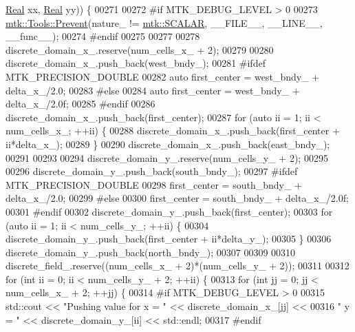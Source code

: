 \begin{DoxyCode}
      \hyperlink{group__c01-roots_gac080bbbf5cbb5502c9f00405f894857d}{Real} xx, \hyperlink{group__c01-roots_gac080bbbf5cbb5502c9f00405f894857d}{Real} yy)) \{
00271 
00272 \textcolor{preprocessor}{  #if MTK\_DEBUG\_LEVEL > 0}
00273   \hyperlink{classmtk_1_1Tools_a332324c6f25e66be9dff48c5987a3b9f}{mtk::Tools::Prevent}(nature\_ != \hyperlink{namespacemtk_ga4c54f2a329cfb4e56213b02a259d19e2af481d45bd70d41381c7d72e200889205}{mtk::SCALAR}, \_\_FILE\_\_, \_\_LINE\_\_, \_\_func\_\_);
00274 \textcolor{preprocessor}{  #endif}
00275 
00277 
00278   discrete\_domain\_x\_.reserve(num\_cells\_x\_ + 2);
00279 
00280   discrete\_domain\_x\_.push\_back(west\_bndy\_);
00281 \textcolor{preprocessor}{  #ifdef MTK\_PRECISION\_DOUBLE}
00282   \textcolor{keyword}{auto} first\_center = west\_bndy\_ + delta\_x\_/2.0;
00283 \textcolor{preprocessor}{  #else}
00284   \textcolor{keyword}{auto} first\_center = west\_bndy\_ + delta\_x\_/2.0f;
00285 \textcolor{preprocessor}{  #endif}
00286   discrete\_domain\_x\_.push\_back(first\_center);
00287   \textcolor{keywordflow}{for} (\textcolor{keyword}{auto} ii = 1; ii < num\_cells\_x\_; ++ii) \{
00288     discrete\_domain\_x\_.push\_back(first\_center + ii*delta\_x\_);
00289   \}
00290   discrete\_domain\_x\_.push\_back(east\_bndy\_);
00291 
00293 
00294   discrete\_domain\_y\_.reserve(num\_cells\_y\_ + 2);
00295 
00296   discrete\_domain\_y\_.push\_back(south\_bndy\_);
00297 \textcolor{preprocessor}{  #ifdef MTK\_PRECISION\_DOUBLE}
00298   first\_center = south\_bndy\_ + delta\_x\_/2.0;
00299 \textcolor{preprocessor}{  #else}
00300   first\_center = south\_bndy\_ + delta\_x\_/2.0f;
00301 \textcolor{preprocessor}{  #endif}
00302   discrete\_domain\_y\_.push\_back(first\_center);
00303   \textcolor{keywordflow}{for} (\textcolor{keyword}{auto} ii = 1; ii < num\_cells\_y\_; ++ii) \{
00304     discrete\_domain\_y\_.push\_back(first\_center + ii*delta\_y\_);
00305   \}
00306   discrete\_domain\_y\_.push\_back(north\_bndy\_);
00307 
00309 
00310   discrete\_field\_.reserve((num\_cells\_x\_ + 2)*(num\_cells\_y\_ + 2));
00311 
00312   \textcolor{keywordflow}{for} (\textcolor{keywordtype}{int} ii = 0; ii < num\_cells\_y\_ + 2; ++ii) \{
00313     \textcolor{keywordflow}{for} (\textcolor{keywordtype}{int} jj = 0; jj < num\_cells\_x\_ + 2; ++jj) \{
00314 \textcolor{preprocessor}{      #if MTK\_DEBUG\_LEVEL > 0}
00315       std::cout << \textcolor{stringliteral}{"Pushing value for x = "} << discrete\_domain\_x\_[jj] <<
00316         \textcolor{stringliteral}{" y = "} << discrete\_domain\_y\_[ii] << std::endl;
00317 \textcolor{preprocessor}{      #endif}

\end{DoxyCode}
